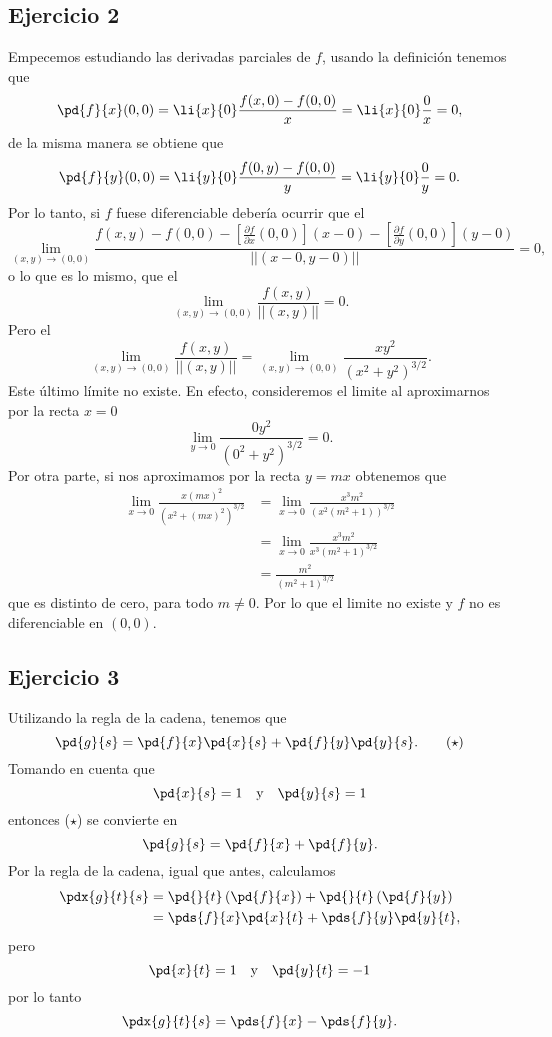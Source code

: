 \subsection*{Ejercicio 2}
	\begin{sol}
		Empecemos estudiando las derivadas parciales de $f$, usando la definición tenemos que 
		$$\pd{f}{x}(0,0) = \li{x}{0} \frac{f(x,0) - f(0,0)}{x} = \li{x}{0} \frac{0}{x} = 0,$$
		de la misma manera se obtiene que  
		$$\pd{f}{y}(0,0) = \li{y}{0} \frac{f(0,y) - f(0,0)}{y} = \li{y}{0} \frac{0}{y} = 0.$$
		Por lo tanto, si $f$ fuese diferenciable debería ocurrir que el
		\small
		$$ \lim_{(x,y) \rightarrow (0,0)} \frac{f(x,y) - f(0,0) - [\frac{\partial f}{\partial x}(0,0)](x-0) - [\frac{\partial f}{\partial y}(0,0)](y-0)}{||(x-0,y-0)||} = 0,$$
		\normalsize
		o lo que es lo mismo, que el
		$$  \lim_{(x,y) \rightarrow (0,0)} \dfrac{f(x,y)}{||(x,y)||} = 0.$$
		Pero el
		$$ \lim_{(x,y) \rightarrow (0,0)} \dfrac{f(x,y)}{||(x,y)||} =  \lim_{(x,y) \rightarrow (0,0)} \dfrac{xy^2}{(x^2+y^2)^{3/2}}.$$
		Este último límite no existe. En efecto, consideremos el limite al aproximarnos por la recta $x=0$
		$$\lim_{y \rightarrow 0} \frac{0y^2}{(0^2+y^2)^{3/2}} = 0.$$
		Por otra parte, si nos aproximamos por la recta $y=mx$ obtenemos que
		\begin{align*} 
		\lim_{x \rightarrow 0} \frac{x(mx)^2}{(x^2+(mx)^2)^{3/2}} &= \lim_{x \rightarrow 0} \frac{x^3m^2}{(x^2(m^2+1))^{3/2}} \\ 
		&= \lim_{x \rightarrow 0} \frac{x^3m^2}{x^3(m^2+1)^{3/2}} \\ 
		&= \frac{m^2}{(m^2+1)^{3/2}} 
		\end{align*} 
		que es distinto de cero, para todo $m \neq 0$. Por lo que el limite no existe y $f$ no es diferenciable en $(0,0)$.
	\end{sol}
\subsection*{Ejercicio 3}	
	\begin{sol}
		Utilizando la regla de la cadena, tenemos que 
		\[ \pd{g}{s} = \pd{f}{x}\pd{x}{s} + \pd{f}{y} \pd{y}{s}. \tag{$\star$} \]
		Tomando en cuenta que
		\[ \pd{x}{s} = 1 \quad \text{y} \quad \pd{y}{s} = 1  \] 
		entonces ($\star$) se convierte en
		\[ \pd{g}{s} = \pd{f}{x} + \pd{f}{y}. \]
		Por la regla de la cadena, igual que antes, calculamos
		\begin{align*} \pdx{g}{t}{s} &= \pd{}{t}\left(\pd{f}{x}\right) + \pd{}{t}\left(\pd{f}{y}\right) \\
		&= \pds{f}{x} \pd{x}{t} + \pds{f}{y}\pd{y}{t},					 
		\end{align*}
		pero 
		\[ \pd{x}{t} = 1 \quad \text{y} \quad \pd{y}{t} = -1 \]
		por lo tanto 
		\[ \pdx{g}{t}{s} = \pds{f}{x} - \pds{f}{y}. \]
	\end{sol}

